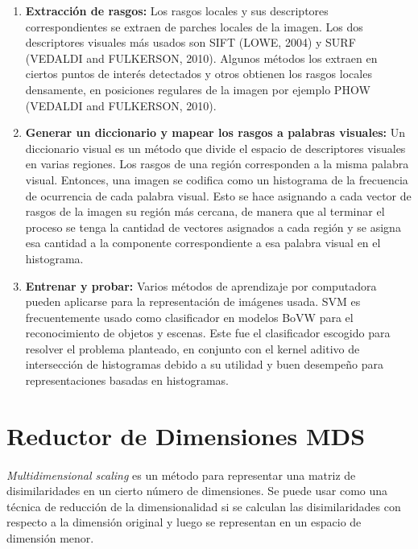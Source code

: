 \begin{enumerate}
	\item \textbf{Extracción de rasgos:} Los rasgos locales y sus descriptores correspondientes se extraen de parches locales de la imagen. Los dos descriptores visuales más usados son SIFT (LOWE, 2004) y SURF (VEDALDI and FULKERSON, 2010). Algunos métodos los extraen en ciertos puntos de interés detectados y otros obtienen los rasgos locales densamente, en posiciones regulares de la imagen por ejemplo PHOW (VEDALDI  and  FULKERSON,  2010).
	\item \textbf{Generar un diccionario y mapear los rasgos a palabras visuales:} Un diccionario visual es un método que divide el espacio de descriptores visuales en varias regiones. Los rasgos de una región corresponden a la misma palabra visual. Entonces, una imagen se codifica como un histograma de la frecuencia de ocurrencia de cada palabra visual. Esto se hace asignando a cada vector de rasgos de la imagen su región más cercana, de manera que al terminar el proceso se tenga la cantidad de vectores asignados a cada región y se asigna esa cantidad a la componente correspondiente a esa palabra visual en el histograma.
	\item \textbf{Entrenar y probar:} Varios métodos de aprendizaje por computadora pueden aplicarse para la representación de imágenes usada. SVM es frecuentemente usado como clasificador en modelos BoVW para el reconocimiento de objetos y escenas. Este fue el clasificador escogido para resolver el problema planteado, en conjunto con el kernel aditivo de intersección de histogramas debido a su utilidad y buen desempeño para representaciones basadas en histogramas.
\end{enumerate}

\section{Reductor de Dimensiones MDS}
\label{mds}
\paragraph{}

\textit{Multidimensional scaling} es un método para representar una matriz de disimilaridades en un cierto número de dimensiones. Se puede usar como una técnica de reducción de la dimensionalidad si se calculan las disimilaridades con respecto a la dimensión original y luego se representan en un espacio de dimensión menor.

